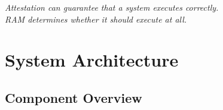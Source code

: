 \documentclass[11pt]{article}
\begin{document}
\begin{center}
\textit{Attestation can guarantee that a system executes correctly.\\
RAM determines whether it should execute at all.}
\end{center}

\section{System Architecture}
\label{sec:arch}

\subsection{Component Overview}
\end{document}
